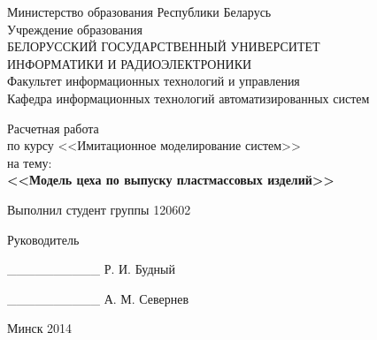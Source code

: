\begin{titlepage}
\thispagestyle{empty}
\setlength{\parindent}{0ex} %

\begin{center}
  Министерство образования Республики Беларусь \\
  \smallskip
  Учреждение образования \\
  БЕЛОРУССКИЙ ГОСУДАРСТВЕННЫЙ УНИВЕРСИТЕТ \\
  ИНФОРМАТИКИ И РАДИОЭЛЕКТРОНИКИ \\
  \smallskip
  Факультет информационных технологий и управления \\
  \smallskip
  Кафедра информационных технологий автоматизированных систем
\end{center}

\vspace{50mm}

\begin{center}
  Расчетная работа \\
  по курсу <<Имитационное моделирование систем>> \\
  на тему: \\
  \textbf{<<Модель цеха по выпуску пластмассовых изделий>>} \\
\end{center}

\vspace{30mm}

\begin{minipage}{.45\linewidth}
    Выполнил студент группы 120602 

    \smallskip

    Руководитель 
\end{minipage}
\hfill
\begin{minipage}{.45\linewidth}
    \_\_\_\_\_\_\_\_\_\_ Р. И. Будный

    \smallskip

    \_\_\_\_\_\_\_\_\_\_ А. М. Севернев
\end{minipage}

\vspace{60mm}
\begin{center}
  Минск 2014
\end{center}

\setlength{\parindent}{5ex} %
\end{titlepage}